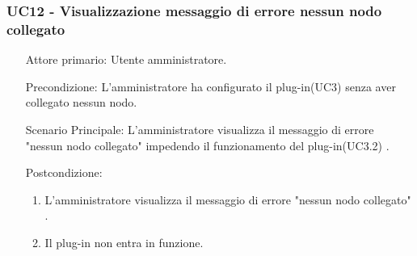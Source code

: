 \subsubsection{UC12 - Visualizzazione messaggio di errore nessun nodo collegato}
\label{sssec:uc12}
\begin{description}
	\begin{enumerate}
		\item[Attore primario:] Utente amministratore.
		\item[Precondizione:] L'amministratore ha configurato il plug-in(UC3) senza aver collegato nessun nodo.
		\item[Scenario Principale:] L'amministratore visualizza il messaggio di errore "nessun nodo collegato" impedendo il funzionamento del plug-in(UC3.2) .
		\item[Postcondizione:]
		\begin{enumerate}
			\item L'amministratore visualizza il messaggio di errore "nessun nodo collegato" .
			\item Il plug-in non entra in funzione.
		\end{enumerate}
	\end{enumerate}
\end{description}